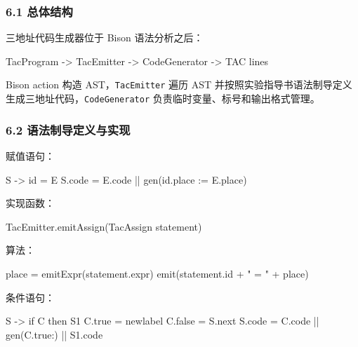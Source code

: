 \documentclass[
  a4paper,
  fontset=none,
]{ctexart}
\newenvironment{Shaded}{}{}
\newcommand{\NormalTok}[1]{#1}
\begin{document}
\hypertarget{ux603bux4f53ux7ed3ux6784}{%
\subsubsection{6.1 总体结构}\label{ux603bux4f53ux7ed3ux6784}}

三地址代码生成器位于 Bison 语法分析之后：

\begin{Shaded}
\begin{Highlighting}[]
\NormalTok{TacProgram {-}\textgreater{} TacEmitter {-}\textgreater{} CodeGenerator {-}\textgreater{} TAC lines}
\end{Highlighting}
\end{Shaded}

Bison action 构造 AST，\texttt{TacEmitter} 遍历 AST
并按照实验指导书语法制导定义生成三地址代码，\texttt{CodeGenerator}
负责临时变量、标号和输出格式管理。

\hypertarget{ux8bedux6cd5ux5236ux5bfcux5b9aux4e49ux4e0eux5b9eux73b0}{%
\subsubsection{6.2
语法制导定义与实现}\label{ux8bedux6cd5ux5236ux5bfcux5b9aux4e49ux4e0eux5b9eux73b0}}

赋值语句：

\begin{Shaded}
\begin{Highlighting}[]
\NormalTok{S {-}\textgreater{} id = E}
\NormalTok{S.code = E.code || gen(id.place := E.place)}
\end{Highlighting}
\end{Shaded}

实现函数：

\begin{Shaded}
\begin{Highlighting}[]
\NormalTok{TacEmitter.emitAssign(TacAssign statement)}
\end{Highlighting}
\end{Shaded}

算法：

\begin{Shaded}
\begin{Highlighting}[]
\NormalTok{place = emitExpr(statement.expr)}
\NormalTok{emit(statement.id + " = " + place)}
\end{Highlighting}
\end{Shaded}

条件语句：

\begin{Shaded}
\begin{Highlighting}[]
\NormalTok{S {-}\textgreater{} if C then S1}
\NormalTok{C.true = newlabel}
\NormalTok{C.false = S.next}
\NormalTok{S.code = C.code || gen(C.true:) || S1.code}
\end{Highlighting}
\end{Shaded}
\end{document}
